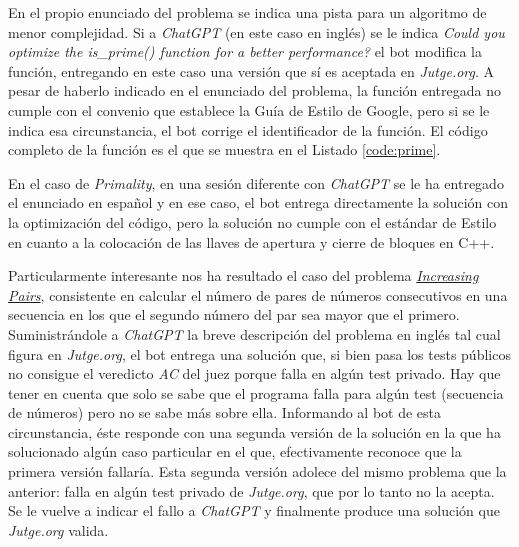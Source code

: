 \documentclass[twocolumn,twoside,a4paper, 10pt]{article}
\newcommand{\jutge}{\textit{Jutge.org}{}}           %
\newcommand{\ChatGPT}{\textit{ChatGPT}{}}           %
\begin{document}
En el propio enunciado del problema se indica una pista para un algoritmo de menor complejidad.
Si a \ChatGPT{} (en este caso en inglés) se le indica
\textit{Could you optimize the is\_prime() function for a better performance?}
el bot modifica la función, entregando en este caso una versión que sí es aceptada en \textit{Jutge.org}.
A pesar de haberlo indicado en el enunciado del problema, la función entregada no cumple con el convenio que
establece la Guía de Estilo de Google, pero si se le indica esa circunstancia, el bot corrige el identificador
de la función. 
El código completo de la función es el que se muestra en el Listado \ref{code:prime}.

En el caso de \textit{Primality}, en una sesión diferente con \ChatGPT{} se le ha entregado el enunciado en español y
en ese caso, el bot entrega directamente la solución con la optimización del código, pero la solución no cumple
con el estándar de Estilo en cuanto a la colocación de las llaves de apertura y cierre de bloques en C++.

Particularmente interesante nos ha resultado el caso del problema
\href{https://jutge.org/problems/P73501_en/statement}{\textit{Increasing Pairs}}, 
consistente en calcular el número de pares de números consecutivos en una secuencia en los que el segundo
número del par sea mayor que el primero.
Suministrándole a \ChatGPT{} la breve descripción del problema en inglés tal cual figura en \jutge{}, el bot
entrega una solución que, si bien pasa los tests públicos no consigue el veredicto \textit{AC} del juez porque
falla en algún test privado.
Hay que tener en cuenta que solo se sabe que el programa falla para algún test (secuencia de números) pero no
se sabe más sobre ella.
Informando al bot de esta circunstancia, éste responde con una segunda versión de la solución en la que ha
solucionado algún caso particular en el que, efectivamente reconoce que la primera versión fallaría.
Esta segunda versión adolece del mismo problema que la anterior: falla en algún test privado de \jutge{}, que
por lo tanto no la acepta.
Se le vuelve a indicar el fallo a \ChatGPT{} y finalmente produce una solución que \jutge{} valida.

\end{document}
